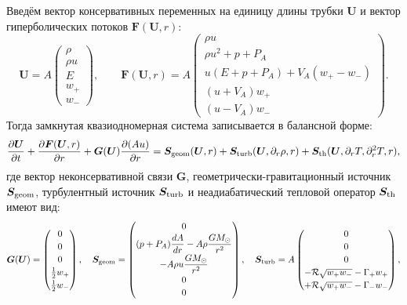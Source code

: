 \documentclass[11pt,a4paper]{article}
\begin{document}
Введём вектор консервативных переменных на единицу длины трубки $\bm{U}$ и вектор гиперболических потоков $\bm{F}(\bm{U}, r)$:
\begin{equation}
\bm{U} = A\begin{pmatrix}
\rho \\[3pt]
\rho u \\[3pt]
E \\[3pt]
w_+ \\[3pt]
w_-
\end{pmatrix}, \qquad
\bm{F}(\bm{U}, r) = A\begin{pmatrix}
\rho u \\[3pt]
\rho u^2 + p + P_A \\[3pt]
u(E + p + P_A) + V_A(w_+ - w_-) \\[3pt]
(u + V_A)w_+ \\[3pt]
(u - V_A)w_-
\end{pmatrix}.
\label{eq:cons_vectors}
\end{equation}
Тогда замкнутая квазиодномерная система записывается в балансной форме:
\begin{equation}
\frac{\partial\bm{U}}{\partial t} + \frac{\partial\bm{F}(\bm{U}, r)}{\partial r} + \bm{G}(\bm{U})\frac{\partial(Au)}{\partial r} = \bm{S}_{\rm geom}(\bm{U}, r) + \bm{S}_{\rm turb}(\bm{U}, \partial_r\rho, r) + \bm{S}_{\rm th}(\bm{U}, \partial_r T, \partial_r^2 T, r),
\label{eq:master_system}
\end{equation}
где вектор неконсервативной связи $\bm{G}$, геометрически-гравитационный источник $\bm{S}_{\rm geom}$, турбулентный источник $\bm{S}_{\rm turb}$ и неадиабатический тепловой оператор $\bm{S}_{\rm th}$ имеют вид:
\begin{equation}
\bm{G}(\bm{U}) = \begin{pmatrix}
0 \\[2pt]
0 \\[2pt]
0 \\[2pt]
\frac{1}{2}w_+ \\[2pt]
\frac{1}{2}w_-
\end{pmatrix}, \quad
\bm{S}_{\rm geom} = \begin{pmatrix}
0 \\[2pt]
(p + P_A)\dfrac{dA}{dr} - A\rho\dfrac{GM_\odot}{r^2} \\[5pt]
-A\rho u\dfrac{GM_\odot}{r^2} \\[5pt]
0 \\[2pt]
0
\end{pmatrix}, \quad
\bm{S}_{\rm turb} = A\begin{pmatrix}
0 \\[2pt]
0 \\[2pt]
0 \\[2pt]
-\mathcal{R}\sqrt{w_+ w_-} - \Gamma_+ w_+ \\[2pt]
+\mathcal{R}\sqrt{w_+ w_-} - \Gamma_- w_-
\end{pmatrix},
\label{eq:source_vectors}
\end{equation}
\end{document}
